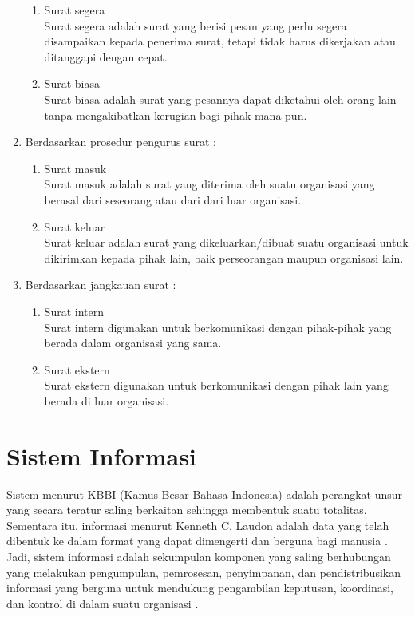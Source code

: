 \begin{enumerate}
\begin{enumerate}
		\item Surat segera \\
		Surat segera adalah surat yang berisi pesan yang perlu segera disampaikan kepada penerima surat, tetapi tidak harus dikerjakan atau ditanggapi dengan cepat.
		\item Surat biasa \\
		Surat biasa adalah surat yang pesannya dapat diketahui oleh orang lain tanpa mengakibatkan kerugian bagi pihak mana pun. 
	\end{enumerate}
	\item Berdasarkan prosedur pengurus surat :
	\begin{enumerate}
		\item Surat masuk \\
		Surat masuk adalah surat yang diterima oleh suatu organisasi yang berasal dari seseorang atau dari dari luar organisasi.
		\item Surat keluar \\
		Surat keluar adalah surat yang dikeluarkan/dibuat suatu organisasi untuk dikirimkan kepada pihak lain, baik perseorangan maupun organisasi lain.
	\end{enumerate}
	\item Berdasarkan jangkauan surat :
	\begin{enumerate}
		\item Surat intern \\
		Surat intern digunakan untuk berkomunikasi dengan pihak-pihak yang berada dalam organisasi yang sama.
		\item Surat ekstern \\
		Surat ekstern digunakan untuk berkomunikasi dengan pihak lain yang berada di luar organisasi.
	\end{enumerate}
\end{enumerate}

\section{Sistem Informasi}
\label{sec:sistem_informasi}
Sistem menurut KBBI (Kamus Besar Bahasa Indonesia) adalah perangkat unsur yang secara teratur saling berkaitan sehingga membentuk suatu totalitas. Sementara itu, informasi menurut Kenneth C. Laudon adalah data yang telah dibentuk ke dalam format yang dapat dimengerti dan berguna bagi manusia \cite{Laudon:2011}. Jadi, sistem informasi adalah sekumpulan komponen yang saling berhubungan yang melakukan pengumpulan, pemrosesan, penyimpanan, dan pendistribusikan informasi yang berguna untuk mendukung pengambilan keputusan, koordinasi, dan kontrol di dalam suatu organisasi \cite{Laudon:2011}.\

